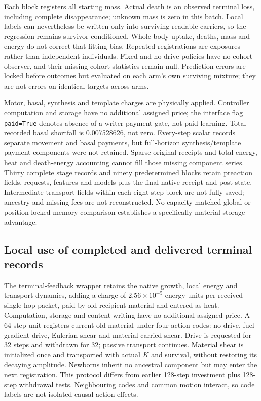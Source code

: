 Each block registers all starting mass. Actual death is an observed terminal loss, including complete disappearance; unknown mass is zero in this batch. Local labels can nevertheless be written only into surviving readable carriers, so the regression remains survivor-conditioned. Whole-body uptake, deaths, mass and energy do not correct that fitting bias. Repeated registrations are exposures rather than independent individuals. Fixed and no-drive policies have no cohort observer, and their missing cohort statistics remain null. Prediction errors are locked before outcomes but evaluated on each arm's own surviving mixture; they are not errors on identical targets across arms.

Motor, basal, synthesis and template charges are physically applied. Controller computation and storage have no additional assigned price; the interface flag \texttt{paid=True} denotes absence of a writer-payment gate, not paid learning. Total recorded basal shortfall is 0.007528626, not zero. Every-step scalar records separate movement and basal payments, but full-horizon synthesis/template payment components were not retained. Sparse original receipts and total energy, heat and death-energy accounting cannot fill those missing component series. Thirty complete stage records and ninety predetermined blocks retain preaction fields, requests, features and models plus the final native receipt and post-state. Intermediate transport fields within each eight-step block are not fully saved; ancestry and missing fees are not reconstructed. No capacity-matched global or position-locked memory comparison establishes a specifically material-storage advantage.

\subsection*{Local use of completed and delivered terminal records}
The terminal-feedback wrapper retains the native growth, local energy and transport dynamics, adding a charge of $2.56\times10^{-5}$ energy units per received single-hop packet, paid by old recipient material and entered as heat. Computation, storage and content writing have no additional assigned price. A 64-step unit registers current old material under four action codes: no drive, fuel-gradient drive, Eulerian shear and material-carried shear. Drive is requested for 32 steps and withdrawn for 32; passive transport continues. Material shear is initialized once and transported with actual $K$ and survival, without restoring its decaying amplitude. Newborns inherit no ancestral component but may enter the next registration. This protocol differs from earlier 128-step investment plus 128-step withdrawal tests. Neighbouring codes and common motion interact, so code labels are not isolated causal action effects.

